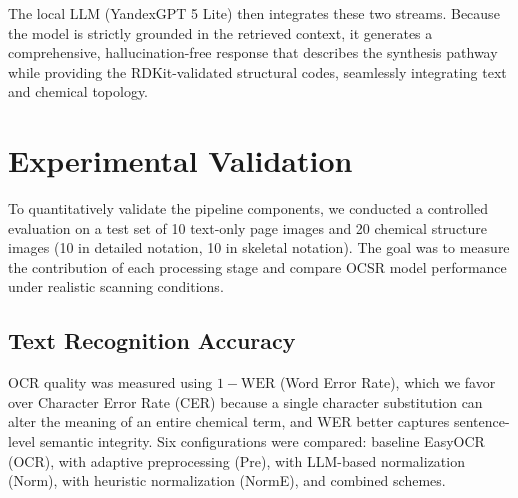 \documentclass[conference]{IEEEtran}
\begin{document}
The local LLM (YandexGPT 5 Lite) then integrates these two streams. Because the model is strictly grounded in the retrieved context, it generates a comprehensive, hallucination-free response that describes the synthesis pathway while providing the RDKit-validated structural codes, seamlessly integrating text and chemical topology.

\section{Experimental Validation}

To quantitatively validate the pipeline components, we conducted a controlled evaluation on a test set of 10 text-only page images and 20 chemical structure images (10 in detailed notation, 10 in skeletal notation). The goal was to measure the contribution of each processing stage and compare OCSR model performance under realistic scanning conditions.

\subsection{Text Recognition Accuracy}

OCR quality was measured using $1 - \text{WER}$ (Word Error Rate), which we favor over Character Error Rate (CER) because a single character substitution can alter the meaning of an entire chemical term, and WER better captures sentence-level semantic integrity. Six configurations were compared: baseline EasyOCR (OCR), with adaptive preprocessing (Pre), with LLM-based normalization (Norm), with heuristic normalization (NormE), and combined schemes.
\end{document}
